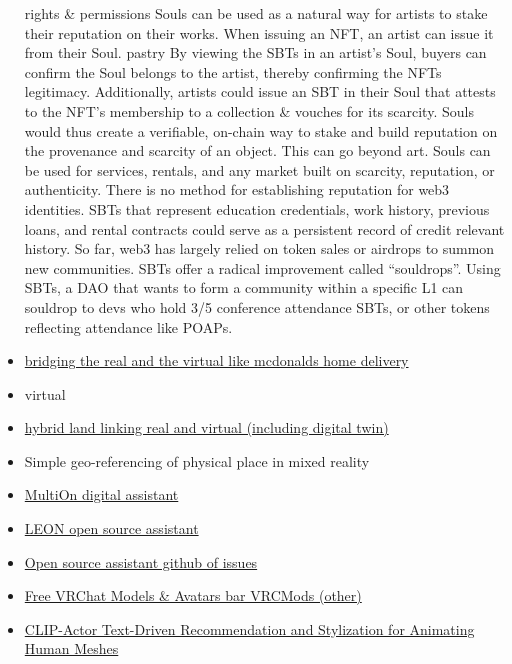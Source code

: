 \begin{itemize}
  rights \& permissions                         Souls can be used as a
  natural way for artists to stake their reputation on their works. When
  issuing an NFT, an artist can issue it from their Soul. pastry By
  viewing the SBTs in an artist's Soul, buyers can confirm the Soul
  belongs to the artist, thereby confirming the NFTs legitimacy.
  Additionally, artists could issue an SBT in their Soul that attests to
  the NFT's membership to a collection \& vouches for its scarcity.
  Souls would thus create a verifiable, on-chain way to stake and build
  reputation on the provenance and scarcity of an object. This can go
  beyond art. Souls can be used for services, rentals, and any market
  built on scarcity, reputation, or authenticity. There is no method for
  establishing reputation for web3 identities. SBTs that represent
  education credentials, work history, previous loans, and rental
  contracts could serve as a persistent record of credit relevant
  history.                                             So far, web3 has
  largely relied on token sales or airdrops to summon new communities.
  SBTs offer a radical improvement called ``souldrops''. Using SBTs, a
  DAO that wants to form a community within a specific L1 can souldrop
  to devs who hold 3/5 conference attendance SBTs, or other tokens
  reflecting attendance like POAPs.
\item
  \href{https://www.businessinsider.com/mcdonalds-metaverse-virtual-online-restaurant-trademark-delivers-food-web3-nft-2022-2}{bridging
  the real and the virtual like mcdonalds home delivery}
\item
  virtual
\item
  \href{https://labusinessjournal.com/featured/metahouse-could-be-first-of-many/}{hybrid
  land linking real and virtual (including digital twin)}
\item
  Simple geo-referencing of physical place in mixed reality
\item
  \href{https://multion.ai/}{MultiOn digital assistant}
\item
  \href{https://docs.getleon.ai/}{LEON open source assistant}
\item
  \href{https://github.com/LAION-AI/Open-Assistant/issues}{Open source
  assistant github of issues}
\item
  \href{https://vrcmods.com/}{Free VRChat Models \& Avatars bar{}
  VRCMods (other)}
\item
  \href{https://clip-actor.github.io/}{CLIP-Actor Text-Driven
  Recommendation and Stylization for Animating Human Meshes}

\end{itemize}
